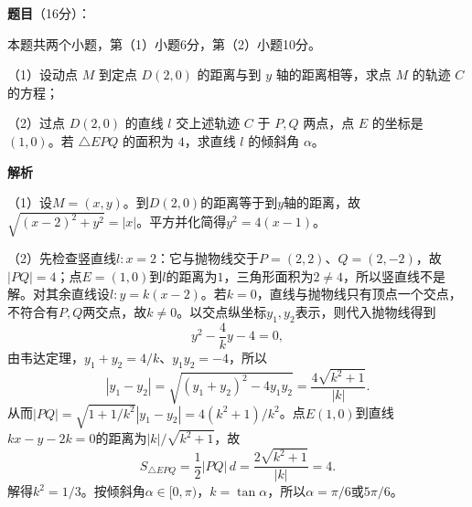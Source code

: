 \begin{answer}

\textbf{题目}（16分）：

本题共两个小题，第（1）小题6分，第（2）小题10分。

（1）设动点 $M$ 到定点 $D(2,0)$ 的距离与到 $y$ 轴的距离相等，求点 $M$ 的轨迹 $C$ 的方程；

（2）过点 $D(2,0)$ 的直线 $l$ 交上述轨迹 $C$ 于 $P,Q$ 两点，点 $E$ 的坐标是 $(1,0)$。若 $\triangle EPQ$ 的面积为 $4$，求直线 $l$ 的倾斜角 $\alpha$。

\textbf{解析}

（1）设$M=(x,y)$。到$D(2,0)$的距离等于到$y$轴的距离，故$\sqrt{(x-2)^2+y^2}=|x|$。平方并化简得$y^2=4(x-1)$。

（2）先检查竖直线$l:x=2$：它与抛物线交于$P=(2,2)$、$Q=(2,-2)$，故$|PQ|=4$；点$E=(1,0)$到$l$的距离为$1$，三角形面积为$2\ne4$，所以竖直线不是解。对其余直线设$l:y=k(x-2)$。若$k=0$，直线与抛物线只有顶点一个交点，不符合有$P,Q$两交点，故$k\ne0$。以交点纵坐标$y_1,y_2$表示，则代入抛物线得到
\nopagebreak[4]
\[
y^2-\frac4k y-4=0,
\]
由韦达定理，$y_1+y_2=4/k$、$y_1y_2=-4$，所以
\nopagebreak[4]
\[
|y_1-y_2|=\sqrt{(y_1+y_2)^2-4y_1y_2}=\frac{4\sqrt{k^2+1}}{|k|}.
\]
从而$|PQ|=\sqrt{1+1/k^2}|y_1-y_2|=4(k^2+1)/k^2$。点$E(1,0)$到直线$kx-y-2k=0$的距离为$|k|/\sqrt{k^2+1}$，故
\nopagebreak[4]
\[
S_{\triangle EPQ}=\frac12|PQ|\,d=\frac{2\sqrt{k^2+1}}{|k|}=4.
\]
解得$k^2=1/3$。按倾斜角$\alpha\in[0,\pi)$，$k=\tan\alpha$，所以$\alpha=\pi/6$或$5\pi/6$。
\nopagebreak[4]
\begin{center}\end{center}
\nopagebreak[4]

\end{answer}
